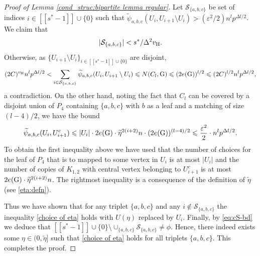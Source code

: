 \documentclass[a4paper,11pt,english,reqno]{amsart}
\numberwithin{equation}{section}
\renewcommand{\leq}{\leqslant}
\newcommand{\uH}{\textup{H}}
\newcommand{\tu}[1]{\textup{#1}}
\newcommand{\set}[1]{[\![#1]\!]}
\begin{document}
\begin{proof}[Proof of Lemma \ref{cond_struc:bipartite lemma regular}]
Let $\mathcal{S}_{\{a,b,c\}} $ be set of indices $i \in \set{s^*-1}\cup\{0\}$ such that  $\widetilde \psi_{a,b,c}(U_{i}, U_{i+1}\setminus U_{i}) > (\varepsilon^2/2)n^{l}p^{\Delta l/2}$. We claim that 
\begin{equation}\label{eq:cS-bd}
	|\mathcal{S}_{\{a,b,c\}}| <s^*/\Delta^2 v_{\uH}. 
\end{equation} 
Otherwise, as $\{U_{i+1}\setminus U_i\}_{i \in \set{s^*-1} \cup \{0\}}$ are disjoint,
\begin{equation*}
	(2C)^{v_{\uH}} n^l p^{\Delta l/2} < \sum_{i \in \mathcal{S}_{\{a,b,c\}}} \widetilde \psi_{a,b,c}(U_{i}, U_{i+1}\setminus U_{i})\leq N(C_{l}, \tu{G})\leq (2e(\tu{G}))^{l/2}\leq (2C)^{l/2}n^{l}p^{\Delta l/2},
\end{equation*}
a contradiction. On the other hand, noting the fact that $C_{l}$ can be covered by a  disjoint union of $P_4$ containing $\{a,b,c\}$ with $b$ as a leaf and a matching of size $(l-4)/2$, we have the bound 
\begin{equation*}
	\widetilde \psi_{a,b,c}(U_{i}, U_{i+1}^{c})\leq |U_{i}|\cdot 2e(\tu{G})\cdot \widetilde \eta^{2(i+2)}n \cdot (2e(\tu{G}))^{(l-4)/2} \leq \frac{\varepsilon^2}{2} \cdot n^{l}p^{\Delta l/2}.  
\end{equation*}  
To obtain the first inequality above we have used that the number of choices for the leaf of $P_4$  that is to mapped to some vertex in $U_i$ is at most $|U_i|$ and the number of copies of $K_{1,2}$ with central vertex belonging to $U_{i+1}^c$ is at most $2 e(\tu{G}) \cdot \widetilde \eta^{2(i+2)} n$. The rightmost inequality is a consequence of the definition of $\widetilde \eta$ (see \eqref{eta:defn}). 

Thus we have shown that for any triplet $\{a, b, c\}$ and any $i \notin \mathcal{S}_{\{a,b,c\}}$ the inequality \eqref{choice of eta} holds with $U(\eta)$ replaced by $U_i$. Finally, by \eqref{eq:cS-bd} we deduce that $\set{s^*-1} \cup \{0\}\setminus \cup_{\{a,b,c\}} \mathcal{S}_{\{a,b,c\}} \neq \phi$. Hence, there indeed exists some $\eta \in (0, \widetilde{\eta}]$ such that \eqref{choice of eta} holds for all triplets $\{a,b,c\}$. This completes the proof.
%
\end{proof}
\end{document}
